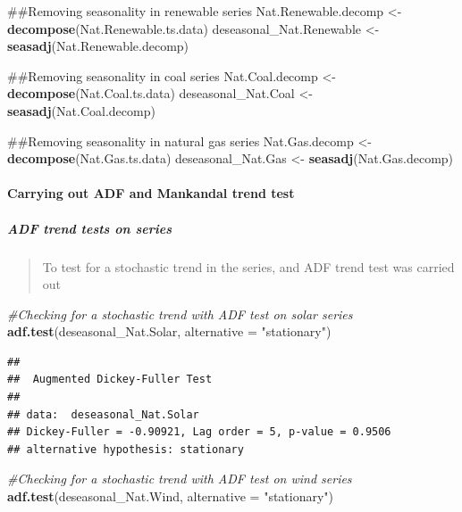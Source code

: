 \documentclass[12pt,]{article}
\newenvironment{Shaded}{\begin{snugshade}}{\end{snugshade}}
\newcommand{\KeywordTok}[1]{\textcolor[rgb]{0.13,0.29,0.53}{\textbf{#1}}}
\newcommand{\DataTypeTok}[1]{\textcolor[rgb]{0.13,0.29,0.53}{#1}}
\newcommand{\StringTok}[1]{\textcolor[rgb]{0.31,0.60,0.02}{#1}}
\newcommand{\CommentTok}[1]{\textcolor[rgb]{0.56,0.35,0.01}{\textit{#1}}}
\newcommand{\NormalTok}[1]{#1}
\let\oldparagraph\paragraph
\renewcommand{\paragraph}[1]{\oldparagraph{#1}\mbox{}}
\let\oldsubparagraph\subparagraph
\renewcommand{\subparagraph}[1]{\oldsubparagraph{#1}\mbox{}}
\begin{document}
\begin{Shaded}
\begin{Highlighting}[]
\NormalTok{##Removing seasonality in renewable series}
\NormalTok{Nat.Renewable.decomp <-}\StringTok{ }\KeywordTok{decompose}\NormalTok{(Nat.Renewable.ts.data)}
\NormalTok{deseasonal_Nat.Renewable <-}\StringTok{ }\KeywordTok{seasadj}\NormalTok{(Nat.Renewable.decomp)}

\NormalTok{##Removing seasonality in coal series}
\NormalTok{Nat.Coal.decomp <-}\StringTok{ }\KeywordTok{decompose}\NormalTok{(Nat.Coal.ts.data)}
\NormalTok{deseasonal_Nat.Coal <-}\StringTok{ }\KeywordTok{seasadj}\NormalTok{(Nat.Coal.decomp)}

\NormalTok{##Removing seasonality in natural gas series}
\NormalTok{Nat.Gas.decomp <-}\StringTok{ }\KeywordTok{decompose}\NormalTok{(Nat.Gas.ts.data)}
\NormalTok{deseasonal_Nat.Gas <-}\StringTok{ }\KeywordTok{seasadj}\NormalTok{(Nat.Gas.decomp)}
\end{Highlighting}
\end{Shaded}

\paragraph{Carrying out ADF and Mankandal trend
test}\label{carrying-out-adf-and-mankandal-trend-test}

\subparagraph{ADF trend tests on
series}\label{adf-trend-tests-on-series}

\begin{quote}
To test for a stochastic trend in the series, and ADF trend test was
carried out
\end{quote}

\begin{Shaded}
\begin{Highlighting}[]
\CommentTok{#Checking for a stochastic trend with ADF test on solar series }
\KeywordTok{adf.test}\NormalTok{(deseasonal_Nat.Solar, }\DataTypeTok{alternative =} \StringTok{"stationary"}\NormalTok{)}
\end{Highlighting}
\end{Shaded}

\begin{verbatim}
## 
##  Augmented Dickey-Fuller Test
## 
## data:  deseasonal_Nat.Solar
## Dickey-Fuller = -0.90921, Lag order = 5, p-value = 0.9506
## alternative hypothesis: stationary
\end{verbatim}

\begin{Shaded}
\begin{Highlighting}[]
\CommentTok{#Checking for a stochastic trend with ADF test on wind series }
\KeywordTok{adf.test}\NormalTok{(deseasonal_Nat.Wind, }\DataTypeTok{alternative =} \StringTok{"stationary"}\NormalTok{)}
\end{Highlighting}
\end{Shaded}
\end{document}
